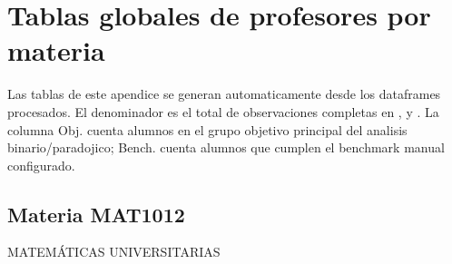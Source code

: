 \clearpage

\appendix

\section{Tablas globales de profesores por materia}

Las tablas de este apendice se generan automaticamente desde los dataframes procesados. El denominador es el total de observaciones completas en ,  y . La columna Obj. cuenta alumnos en el grupo objetivo principal del analisis binario/paradojico; Bench. cuenta alumnos que cumplen el benchmark manual configurado.

\subsection{Materia MAT1012}

MATEMÁTICAS UNIVERSITARIAS

